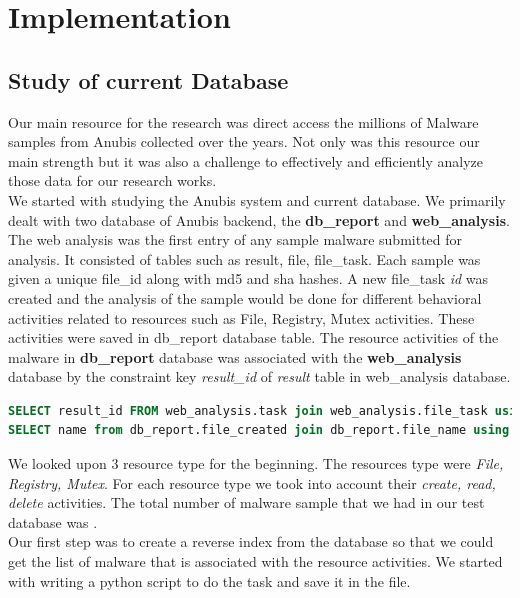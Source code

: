 \chapter{Implementation}\label{chapter:implementation}
\section{Study of current Database}
Our main resource for the research was direct access the millions of Malware samples from Anubis collected over the years. Not only was this resource our main strength but it was also a challenge to effectively and efficiently analyze those data for our research works.\\
We started with studying the Anubis system and current database. We primarily dealt with two database of Anubis backend, the \textbf{db\_report} and \textbf{web\_analysis}.
The web analysis was the first entry of any sample malware submitted for analysis. It consisted of tables such as result, file, file\_task. Each sample was given a unique file\_id along with md5 and sha hashes.
A new file\_task \emph{id} was created  and the analysis of the sample would be done for different behavioral activities related to resources such as File, Registry, Mutex activities.
These activities were saved in db\_report database table. The resource activities of the malware in \textbf{db\_report} database was associated with the \textbf{web\_analysis} database by the constraint key \textit{result\_id} of \emph{result} table in web\_analysis database.
\begin{lstlisting}[language=sql,caption={sql showing database structure to get file created activities of a malware},label={lst:resultidsql}]
SELECT result_id FROM web_analysis.task join web_analysis.file_task using (task_id) join web_analysis.file using (file_id) WHERE task_id=result_id;
SELECT name from db_report.file_created join db_report.file_name using (file_name_id) where result_id ='12345';
\end{lstlisting}
We looked upon 3 resource type for the beginning. The resources type were \textit{File, Registry, Mutex}. For each resource type we took into account their \textit{create, read, delete} activities. The total number of malware sample that we had in our test database was \textbf{\gettotalmalwarei{}}.\\
Our first step was to create a reverse index from the database so that we could get the list of malware that is associated with the resource activities. We started with writing a python script to do the task and save it in the file.
